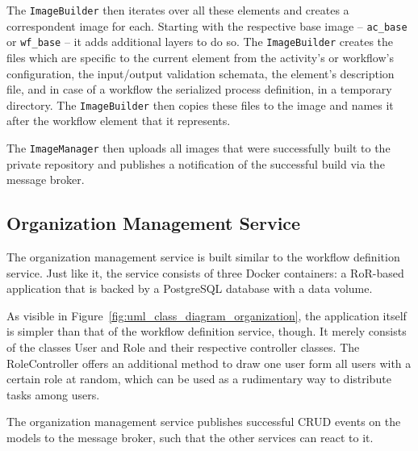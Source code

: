       The \texttt{ImageBuilder} then iterates over all these elements and creates a correspondent image for each. Starting with the respective base image -- \texttt{ac\_base} or \texttt{wf\_base} -- it adds additional layers to do so. The \texttt{ImageBuilder} creates the files which are specific to the current element from the activity's or workflow's configuration, \ie the input/output validation schemata, the element's description file, and in case of a workflow the serialized process definition, in a temporary directory. The \texttt{ImageBuilder} then copies these files to the image and names it after the workflow element that it represents.

      The \texttt{ImageManager} then uploads all images that were successfully built to the private repository and publishes a notification of the successful build via the message broker.

  \subsection{Organization Management Service} %
    \label{sub:organization_management_service}
      The organization management service is built similar to the workflow definition service. Just like it, the service consists of three Docker containers: a \ac{RoR}-based application that is backed by a PostgreSQL database with a data volume.

      As visible in Figure~\ref{fig:uml_class_diagram_organization}, the application itself is simpler than that of the workflow definition service, though. It merely consists of the classes User and Role and their respective controller classes. The RoleController offers an additional method to draw one user form all users with a certain role at random, which can be used as a rudimentary way to distribute tasks among users.

      The organization management service publishes successful CRUD events on the models to the message broker, such that the other services can react to it.

